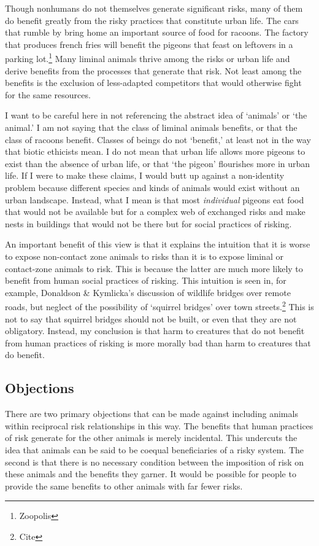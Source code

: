 Though nonhumans do not themselves generate significant risks, many of them do
benefit greatly from the risky practices that constitute urban life. The cars
that rumble by bring home an important source of food for racoons. The factory
that produces french fries will benefit the pigeons that feast on leftovers in
a parking lot.\footnote{Zoopolis} Many liminal animals thrive among the risks
or urban life and derive benefits from the processes that generate that risk.
Not least among the benefits is the exclusion of less-adapted competitors that
would otherwise fight for the same resources.

I want to be careful here in not referencing the abstract idea of ‘animals’ or
‘the animal.’ I am not saying that the class of liminal animals benefits, or
that the class of racoons benefit. Classes of beings do not ‘benefit,’ at least
not in the way that biotic ethicists mean. I do not mean that urban life allows
more pigeons to exist than the absence of urban life, or that ‘the pigeon’
flourishes more in urban life. If I were to make these claims, I would butt up
against a non-identity problem because different species and kinds of animals
would exist without an urban landscape. Instead, what I mean is that most
\emph{individual} pigeons eat food that would not be available but for a complex
web of exchanged risks and make nests in buildings that would not be there but
for social practices of risking.

An important benefit of this view is that it explains the intuition that it is
worse to expose non-contact zone animals to risks than it is to expose liminal
or contact-zone animals to risk. This is because the latter are
much more likely to benefit from human social practices of risking. This
intuition is seen in, for example, Donaldson \& Kymlicka’s discussion of
wildlife bridges over remote roads, but neglect of the possibility of ‘squirrel
bridges’ over town streets.\footnote{Cite} This is not to say that squirrel
bridges should not be built, or even that they are not obligatory. Instead, my
conclusion is that harm to creatures that do not benefit from human practices
of risking is more morally bad than harm to creatures that do benefit.

\subsection{Objections}

There are two primary objections that can be made against including animals
within reciprocal risk relationships in this way. The benefits that human
practices of risk generate for the other animals is merely incidental. This
undercuts the idea that animals can be said to be coequal beneficiaries of a
risky system.  The second is that there is no necessary condition between the
imposition of risk on these animals and the benefits they garner. It would be
possible for people to provide the same benefits to other animals with far
fewer risks.

